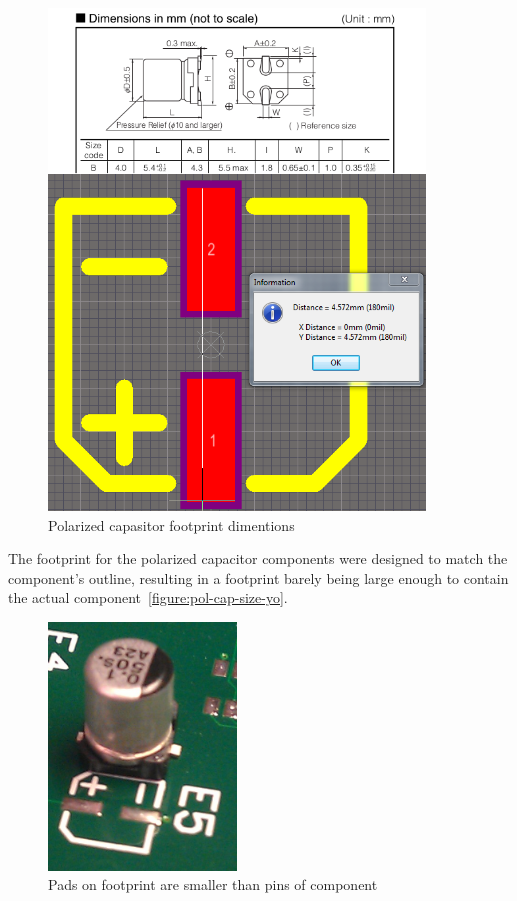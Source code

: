 \begin{figure}
\centering
\includegraphics[width=10cm,keepaspectratio]{pcb/pol_cap_size_footprint_vs_specs.png}
\caption{Polarized capasitor footprint dimentions}
\label{figure:pol-cap-size-yo}
\end{figure}

The footprint for the polarized capacitor components were designed to match the component's outline, resulting in a footprint barely being large enough to contain the actual component~\vref{figure:pol-cap-size-yo}.

\begin{figure}
\centering
\includegraphics[width=5cm,keepaspectratio]{pcb/pol_cap_size_on_board.png}
\caption{Pads on footprint are smaller than pins of component}
\label{figure:pol-cap-size-board}
\end{figure}

